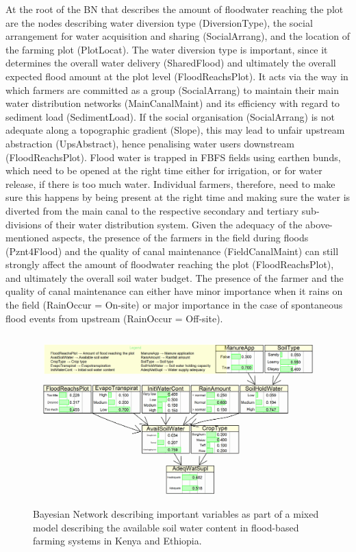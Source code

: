 \documentclass[]{elsarticle} %
\begin{document}
At the root of the BN that describes the amount of floodwater reaching the plot are the nodes describing water diversion type (DiversionType), the social arrangement for water acquisition and sharing (SocialArrang), and the location of the farming plot (PlotLocat). The water diversion type is important, since it determines the overall water delivery (SharedFlood) and ultimately the overall expected flood amount at the plot level (FloodReachsPlot). It acts via the way in which farmers are committed as a group (SocialArrang) to maintain their main water distribution networks (MainCanalMaint) and its efficiency with regard to sediment load (SedimentLoad). If the social organisation (SocialArrang) is not adequate along a topographic gradient (Slope), this may lead to unfair upstream abstraction (UpsAbstract), hence penalising water users downstream (FloodReachsPlot). Flood water is trapped in FBFS fields using earthen bunds, which need to be opened at the right time either for irrigation, or for water release, if there is too much water. Individual farmers, therefore, need to make sure this happens by being present at the right time and making sure the water is diverted from the main canal to the respective secondary and tertiary sub-divisions of their water distribution system. Given the adequacy of the above-mentioned aspects, the presence of the farmers in the field during floods (Pznt4Flood) and the quality of canal maintenance (FieldCanalMaint) can still strongly affect the amount of floodwater reaching the plot (FloodReachsPlot), and ultimately the overall soil water budget. The presence of the farmer and the quality of canal maintenance can either have minor importance when it rains on the field (RainOccur = On-site) or major importance in the case of spontaneous flood events from upstream (RainOccur = Off-site).

\begin{figure}[!h]

{\centering \includegraphics[width=1\linewidth,]{figures/figure_s3} 

}

\caption{Bayesian Network describing important variables as part of a mixed model describing the available soil water content in flood-based farming systems in Kenya and Ethiopia.}\label{fig:fig3}
\end{figure}
\end{document}
